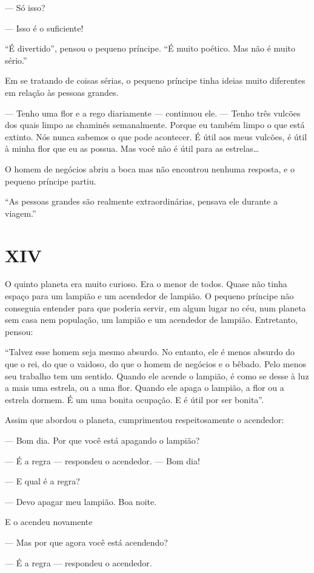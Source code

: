 \begin{Parallel}[p]{}{}
{--- Só isso?

--- Isso é o suficiente!

``É divertido'', pensou o pequeno príncipe. ``É muito poético. Mas não é
muito sério.''

Em se tratando de coisas sérias, o pequeno príncipe tinha ideias muito
diferentes em relação às pessoas grandes.

--- Tenho uma flor e a rego diariamente --- continuou ele. --- Tenho três
vulcões dos quais limpo as chaminés semanalmente. Porque eu também limpo
o que está extinto. Nós nunca sabemos o que pode acontecer. É útil aos
meus vulcões, é útil à minha flor que eu as possua. Mas você não é útil
para as estrelas\ldots{}

O homem de negócios abriu a boca mas não encontrou nenhuma resposta, e o
pequeno príncipe partiu.

``As pessoas grandes são realmente extraordinárias, pensava ele durante
a viagem.''

\section{XIV}

O quinto planeta era muito curioso. Era o menor de todos. Quase não
tinha espaço para um lampião e um acendedor de lampião. O pequeno
príncipe não conseguia entender para que poderia servir, em algum lugar
no céu, num planeta sem casa nem população, um lampião e um acendedor de
lampião. Entretanto, pensou:

``Talvez esse homem seja mesmo absurdo. No entanto, ele é menos absurdo
do que o rei, do que o vaidoso, do que o homem de negócios e o bêbado.
Pelo menos seu trabalho tem um sentido. Quando ele acende o lampião, é
como se desse à luz a mais uma estrela, ou a uma flor. Quando ele apaga
o lampião, a flor ou a estrela dormem. É um uma bonita ocupação. E é
útil por ser bonita''.

Assim que abordou o planeta, cumprimentou respeitosamente o acendedor:

--- Bom dia. Por que você está apagando o lampião?

--- É a regra --- respondeu o acendedor. --- Bom dia!

--- E qual é a regra?

--- Devo apagar meu lampião. Boa noite.

E o acendeu novamente

--- Mas por que agora você está acendendo?

--- É a regra --- respondeu o acendedor.

}
\end{Parallel}
